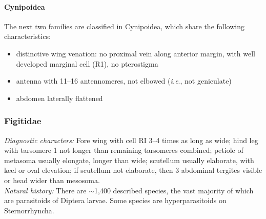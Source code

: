 \documentclass[letterpaper, 11pt]{article}
\begin{document}
\paragraph*{Cynipoidea} The next two families are classified in Cynipoidea, which share the following characteristics:
\begin{itemize}
\item distinctive wing venation: no proximal vein along anterior margin, with well developed marginal cell (R1), no pterostigma
\item antenna with 11--16 antennomeres, not elbowed (\textit{i.e}., not geniculate)
\item abdomen laterally flattened
\end{itemize}

\subsubsection{Figitidae}
\noindent{}\textit{Diagnostic characters:} Fore wing with cell RI 3--4 times as long as wide; hind leg with tarsomere 1 not longer than remaining tarsomeres combined; petiole of metasoma usually elongate, longer than wide; scutellum usually elaborate, with keel or oval elevation; if scutellum not elaborate, then 3 abdominal tergites visible or head wider than mesosoma.\\

\noindent{}\textit{Natural history:} There are $\sim$1,400 described species, the vast majority of which are parasitoids of Diptera larvae. Some species are hyperparasitoids on Sternorrhyncha. \\
\end{document}
